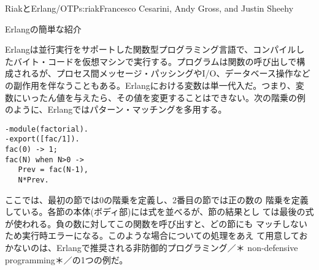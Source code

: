 \begin{aosachapter}{RiakとErlang/OTP}{s:riak}{Francesco Cesarini, Andy Gross, and Justin Sheehy}
\begin{aosasect1}{Erlangの簡単な紹介}


Erlangは並行実行をサポートした関数型プログラミング言語で、コンパイルし
たバイト・コードを仮想マシンで実行する。プログラムは関数の呼び出しで構
成されるが、プロセス間メッセージ・パッシングやI/O、データベース操作など
の副作用を伴なうこともある。Erlangにおける変数は単一代入だ。つまり、変
数にいったん値を与えたら、その値を変更することはできない。次の階乗の例
のように、Erlangではパターン・マッチングを多用する。

\begin{verbatim}
-module(factorial).
-export([fac/1]).
fac(0) -> 1;
fac(N) when N>0 ->
   Prev = fac(N-1),
   N*Prev.
\end{verbatim}


\noindent ここでは、最初の節では0の階乗を定義し、2番目の節では正の数の
階乗を定義している。各節の本体(ボディ部)には式を並べるが、節の結果とし
ては最後の式が使われる。負の数に対してこの関数を呼び出すと、どの節にも
マッチしないため実行時エラーになる。このような場合についての処理をあえ
て用意しておかないのは、Erlangで推奨される非防御的プログラミング／＊
non-defensive programming＊／の1つの例だ。



\end{aosasect1}
\end{aosachapter}
